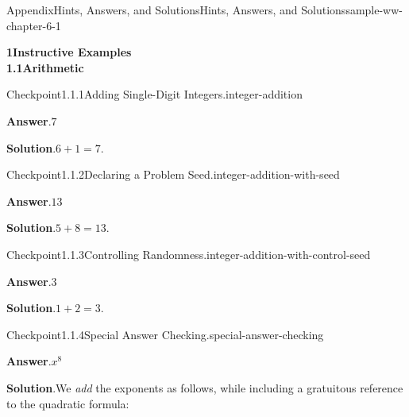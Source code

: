 \documentclass[oneside,10pt,]{book}
\newcommand{\blocktitlefont}{\relax}
\numberwithin{equation}{section}
\begin{document}
\begin{solutions-chapter}{Appendix}{Hints, Answers, and Solutions}{}{Hints, Answers, and Solutions}{}{}{sample-ww-chapter-6-1}
\par\medskip
\noindent\textbf{\Large{}1\space\textperiodcentered\space{}Instructive Examples\\
1.1\space\textperiodcentered\space{}Arithmetic}
\begin{inlinesolution}{Checkpoint}{1.1.1}{Adding Single-Digit Integers.}{integer-addition}%
\par\smallskip%
\noindent\textbf{\blocktitlefont Answer}.\hypertarget{integer-addition-3-back}{}\quad{}\(7\)%
\par\smallskip%
\noindent\textbf{\blocktitlefont Solution}.\hypertarget{integer-addition-4-back}{}\quad{}\(6 + 1 = {7}\text{.}\)%
\end{inlinesolution}%
\begin{inlinesolution}{Checkpoint}{1.1.2}{Declaring a Problem Seed.}{integer-addition-with-seed}%
\par\smallskip%
\noindent\textbf{\blocktitlefont Answer}.\hypertarget{integer-addition-with-seed-3-back}{}\quad{}\(13\)%
\par\smallskip%
\noindent\textbf{\blocktitlefont Solution}.\hypertarget{integer-addition-with-seed-4-back}{}\quad{}\(5 + 8 = {13}\text{.}\)%
\end{inlinesolution}%
\begin{inlinesolution}{Checkpoint}{1.1.3}{Controlling Randomness.}{integer-addition-with-control-seed}%
\par\smallskip%
\noindent\textbf{\blocktitlefont Answer}.\hypertarget{integer-addition-with-control-seed-3-back}{}\quad{}\(3\)%
\par\smallskip%
\noindent\textbf{\blocktitlefont Solution}.\hypertarget{integer-addition-with-control-seed-4-back}{}\quad{}\(1 + 2 = {3}\text{.}\)%
\end{inlinesolution}%
\begin{inlinesolution}{Checkpoint}{1.1.4}{Special Answer Checking.}{special-answer-checking}%
\par\smallskip%
\noindent\textbf{\blocktitlefont Answer}.\hypertarget{special-answer-checking-3-back}{}\quad{}\(x^{8}\)%
\par\smallskip%
\noindent\textbf{\blocktitlefont Solution}.\hypertarget{special-answer-checking-4-back}{}\quad{}We \emph{add} the exponents as follows, while including a gratuitous reference to the quadratic formula:%
\par

\end{inlinesolution}
\end{solutions-chapter}
\end{document}
